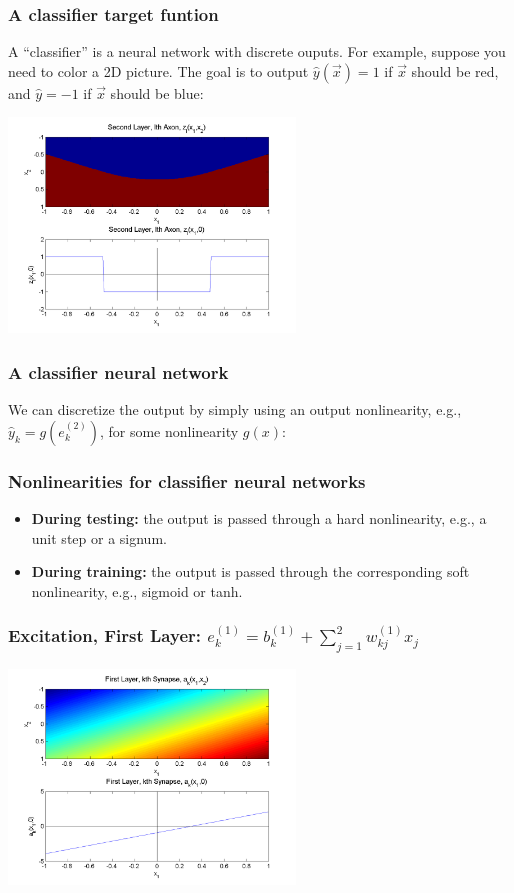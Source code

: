 \documentclass{beamer}
\begin{document}
\begin{frame}
  \frametitle{A classifier target funtion}

  A ``classifier'' is a neural network with discrete ouputs.  For
  example, suppose you need to color a 2D picture.  The goal is to
  output $\hat{y}(\vec{x})=1$ if $\vec{x}$ should be red, and
  $\hat{y}=-1$ if $\vec{x}$ should be blue:

  \centerline{\includegraphics[width=3in]{figs/nn_axon2.png}}
\end{frame}

\begin{frame}
  \frametitle{A classifier neural network}
  We can discretize the output by simply using an output nonlinearity,
  e.g., $\hat{y}_k=g(e_k^{(2)})$, for some nonlinearity $g(x)$:
  \begin{small}\end{small}
\end{frame}

\begin{frame}
  \frametitle{Nonlinearities for classifier neural networks}

  \begin{itemize}
  \item {\bf During testing:} the output is passed through a hard
    nonlinearity, e.g., a unit step or a signum.
  \item {\bf During training:} the output is passed through the corresponding soft
    nonlinearity, e.g., sigmoid or tanh.
  \end{itemize}
\end{frame}

\begin{frame}
  \frametitle{Excitation, First Layer: $e_k^{(1)}=b_{k}^{(1)}+\sum_{j=1}^2 w_{kj}^{(1)}x_j$}
  \centerline{\includegraphics[width=3in]{figs/nn_synapse1.png}}
\end{frame}
\end{document}
